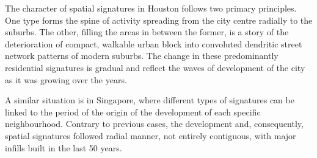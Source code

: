 The character of spatial signatures in Houston follows two primary principles. One type
forms the spine of activity spreading from the city centre radially to the suburbs. The
other, filling the areas in between the former, is a story of the deterioration of
compact, walkable urban block into convoluted dendritic street network patterns of
modern suburbs. The change in these predominantly residential signatures is gradual and
reflect the waves of development of the city as it was growing over the years.

A similar situation is in Singapore, where different types of signatures can be linked
to the period of the origin of the development of each specific neighbourhood. Contrary
to previous cases, the development and, consequently, spatial signatures followed radial
manner, not entirely contiguous, with major infills built in the last 50 years.
